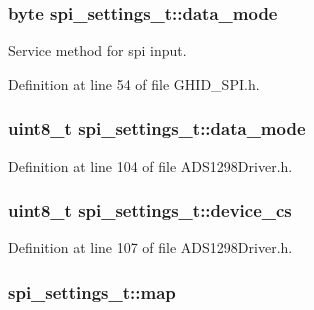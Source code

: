 \hypertarget{structspi__settings__t_a4ef3b51bb59cd49b4ad291443d2e3404}{
\subsubsection[{data\-\_\-mode}]{\setlength{\rightskip}{0pt plus 5cm}byte {\bf spi\-\_\-settings\-\_\-t\-::data\-\_\-mode}}}\label{structspi__settings__t_a4ef3b51bb59cd49b4ad291443d2e3404}


\-Service method for spi input. 



\-Definition at line 54 of file \-G\-H\-I\-D\-\_\-\-S\-P\-I.\-h.

\hypertarget{structspi__settings__t_a4f65ec88d3910aee5cb7c8c7f31c8f95}{
\subsubsection[{data\-\_\-mode}]{\setlength{\rightskip}{0pt plus 5cm}uint8\-\_\-t {\bf spi\-\_\-settings\-\_\-t\-::data\-\_\-mode}}}\label{structspi__settings__t_a4f65ec88d3910aee5cb7c8c7f31c8f95}


\-Definition at line 104 of file \-A\-D\-S1298\-Driver.\-h.

\hypertarget{structspi__settings__t_aa92a826fb3282468e4574cc37e07ae71}{
\subsubsection[{device\-\_\-cs}]{\setlength{\rightskip}{0pt plus 5cm}uint8\-\_\-t {\bf spi\-\_\-settings\-\_\-t\-::device\-\_\-cs}}}\label{structspi__settings__t_aa92a826fb3282468e4574cc37e07ae71}


\-Definition at line 107 of file \-A\-D\-S1298\-Driver.\-h.

\hypertarget{structspi__settings__t_a177d7128802b522adf4b1b9748787fb5}{
\subsubsection[{map}]{ {\bf spi\-\_\-settings\-\_\-t\-::map}}}\label{structspi__settings__t_a177d7128802b522adf4b1b9748787fb5}


